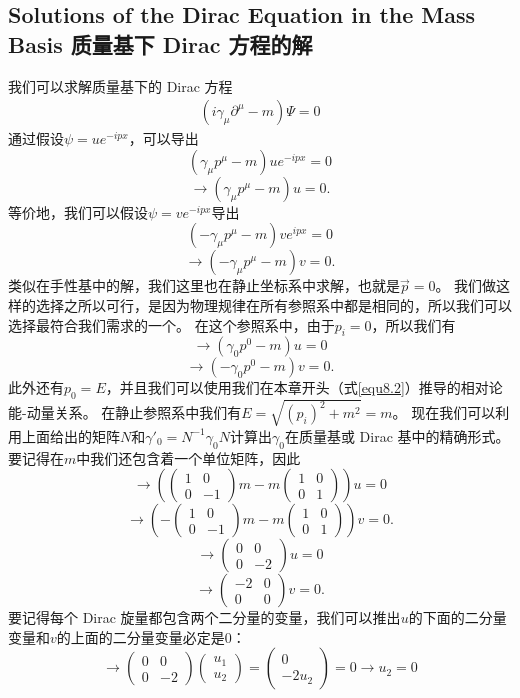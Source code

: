\subsection[质量基下 Dirac 方程的解]{Solutions of the Dirac Equation in the Mass Basis 质量基下 Dirac 方程的解}\label{sec8.10.1}

我们可以求解质量基下的 Dirac 方程
\begin{align}
  (i\gamma_\mu\partial^\mu-m)\Psi=0
\end{align}
通过假设$\psi=ue^{-ipx}$，可以导出
\[(\gamma_\mu p^\mu-m)ue^{-ipx}=0\]
\[\rightarrow(\gamma_\mu p^\mu-m)u=0.\]
等价地，我们可以假设$\psi=ve^{-ipx}$导出
\[(-\gamma_\mu p^\mu-m)ve^{ipx}=0\]
\[\rightarrow(-\gamma_\mu p^\mu-m)v=0.\]
类似在手性基中的解，我们这里也在静止坐标系中求解，也就是$\vec{p}=0$。
我们做这样的选择之所以可行，是因为物理规律在所有参照系中都是相同的，所以我们可以选择最符合我们需求的一个。
在这个参照系中，由于$p_i=0$，所以我们有
\[\rightarrow(\gamma_0p^0-m)u=0\]
\[\rightarrow(-\gamma_0p^0-m)v=0.\]
此外还有$p_0=E$，并且我们可以使用我们在本章开头（式\eqref{equ8.2}）推导的相对论能-动量关系。
在静止参照系中我们有$E=\sqrt{(p_i)^2+m^2}=m$。
现在我们可以利用上面给出的矩阵$N$和$\gamma'_0=N^{-1}\gamma_0N$计算出$\gamma_0$在质量基或 Dirac 基中的精确形式。
要记得在$m$中我们还包含着一个单位矩阵，因此
\[\rightarrow\left(\begin{pmatrix}1&0\\0&-1\end{pmatrix}m-m\begin{pmatrix}1&0\\0&1\end{pmatrix}\right)u=0\]
\[\rightarrow\left(-\begin{pmatrix}1&0\\0&-1\end{pmatrix}m-m\begin{pmatrix}1&0\\0&1\end{pmatrix}\right)v=0.\]
\[\rightarrow\begin{pmatrix}0&0\\0&-2\end{pmatrix}u=0\]
\[\rightarrow\begin{pmatrix}-2&0\\0&0\end{pmatrix}v=0.\]
要记得每个 Dirac 旋量都包含两个二分量的变量，我们可以推出$u$的下面的二分量变量和$v$的上面的二分量变量必定是0：
\[\rightarrow\begin{pmatrix}0&0\\0&-2\end{pmatrix}\begin{pmatrix}u_1\\u_2\end{pmatrix}=\begin{pmatrix}0\\-2u_2\end{pmatrix}=0\rightarrow u_2=0\]
